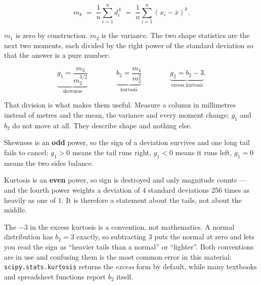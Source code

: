 \documentclass[11pt]{article}
\begin{document}
\begin{equation}
  m_k \;=\; \frac{1}{n}\sum_{i=1}^{n} d_i^{\,k}
  \;=\; \frac{1}{n}\sum_{i=1}^{n} (x_i - \bar{x})^k .
  \label{eq:moment}
\end{equation}

$m_1$ is zero by construction. $m_2$ is the variance. The two shape statistics
are the next two moments, each divided by the right power of the standard
deviation so that the answer is a pure number:

\begin{equation}
  \underbrace{g_1 = \frac{m_3}{m_2^{3/2}}}_{\text{skewness}}
  \qquad\qquad
  \underbrace{b_2 = \frac{m_4}{m_2^{2}}}_{\text{kurtosis}}
  \qquad\qquad
  \underbrace{g_2 = b_2 - 3}_{\text{excess kurtosis}} .
  \label{eq:shape}
\end{equation}

That division is what makes them useful. Measure a column in millimetres
instead of metres and the mean, the variance and every moment change; $g_1$ and
$b_2$ do not move at all. They describe shape and nothing else.

\begin{keyidea}
Skewness is an \textbf{odd} power, so the sign of a deviation survives and one
long tail fails to cancel: $g_1 > 0$ means the tail runs right, $g_1 < 0$ means
it runs left, $g_1 = 0$ means the two sides balance.

Kurtosis is an \textbf{even} power, so sign is destroyed and only magnitude
counts --- and the fourth power weights a deviation of $4$ standard deviations
$256$ times as heavily as one of $1$. It is therefore a statement about the
tails, not about the middle.
\end{keyidea}

The $-3$ in the excess kurtosis is a convention, not mathematics. A normal
distribution has $b_2 = 3$ exactly, so subtracting $3$ puts the normal at zero
and lets you read the sign as ``heavier tails than a normal'' or ``lighter''.
Both conventions are in use and confusing them is the most common error in this
material: \texttt{scipy.stats.kurtosis} returns the \emph{excess} form by
default, while many textbooks and spreadsheet functions report $b_2$ itself.
\end{document}
